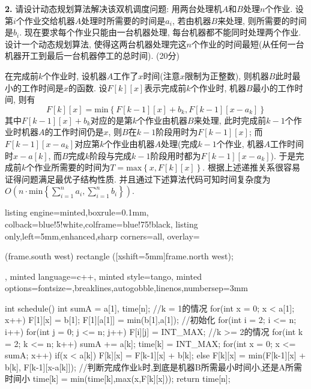\documentclass{article}
\begin{document}
\newpage

\textbf{2.} 请设计动态规划算法解决该双机调度问题: 用两台处理机$A$和$B $处理$n $个作业. 设第$i $个作业交给机器$A $处理时所需要的时间是$a_i$, 若由机器$B $来处理, 则所需要的时间是$b_i$. 现在要求每个作业只能由一台机器处理, 每台机器都不能同时处理两个作业. 设计一个动态规划算法, 使得这两台机器处理完这$n$个作业的时间最短(从任何一台机器开工到最后一台机器停工的总时间). (20分)

\solution 在完成前$k$个作业时, 设机器$A$工作了$x$时间(注意$x$限制为正整数), 则机器$B$此时最小的工作时间是$x$的函数. 设$F[k][x]$表示完成前$k$个作业时, 机器$B$最小的工作时间, 则有
$$
F\left[ k \right] [x] =\text{min} \left\{ F\left[ k-1 \right] [x] +b_k,F\left[ k-1 \right] [x-a_k] \right\} 
$$
其中$F[k-1][x]+b_k$对应的是第$k$个作业由机器$B$来处理, 此时完成前$k-1$个作业时机器$A$的工作时间仍是$x$, 则$B$在$k-1$阶段用时为$F[k-1][x]$; 而$F[k-1][x-a_k]$对应第$k$个作业由机器$A$处理(完成$k-1$个作业, 机器$A$工作时间时$x-a[k]$, 而$B$完成$k$阶段与完成$k-1$阶段用时都为$F[k-1][x-a_k]$). 于是完成前$k$个作业所需要的时间为$T=\text{max} \left\{ x,F\left[ k \right] [x] \right\} $. 根据上述递推关系很容易证得问题满足最优子结构性质. 并且通过下述算法代码可知时间复杂度为$\displaystyle O\left( n\cdot \text{min} \left\{ \sum_{i=1}^n{a_i},\sum_{i=1}^n{b_i} \right\} \right)$.
\begin{tcblisting}{listing engine=minted,boxrule=0.1mm,
colback=blue!5!white,colframe=blue!75!black,
listing only,left=5mm,enhanced,sharp corners=all,
overlay={\begin{tcbclipinterior} (frame.south west)
rectangle ([xshift=5mm]frame.north west);\end{tcbclipinterior}},
minted language=c++,
minted style=tango,
minted options={fontsize=\small,breaklines,autogobble,linenos,numbersep=3mm}}
int schedule() {
int sumA = a[1], time[n];
//k = 1的情况
for(int x = 0; x < a[1]; x++) {
    F[1][x] = b[1];
}
F[1][a[1]] = min(b[1],a[1]);
//初始化
for(int i = 2; i <= n; i++) {
    for(int j = 0; j <= n; j++) {
        F[i][j] = INT_MAX;
    }
}
//k >= 2的情况
for(int k = 2; k <= n; k++) {
    sumA += a[k];
    time[k] = INT_MAX;
    for(int x = 0; x <= sumA; x++) {
        if(x < a[k]) {
            F[k][x] = F[k-1][x] + b[k];
        } else {
            F[k][x] = min(F[k-1][x] + b[k], F[k-1][x-a[k]]);
        }
        //判断完成作业k时,到底是机器B所需最小时间小,还是A所需时间小
        time[k] = min(time[k],max(x,F[k][x]));
    }
}
return time[n];
}
\end{tcblisting}
\end{document}
